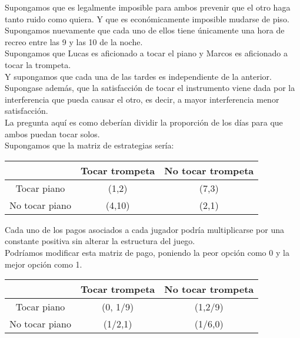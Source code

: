 \documentclass[10pt,a4paper]{book}
\begin{document}
Supongamos que es legalmente imposible para ambos prevenir que el otro haga tanto ruido como quiera. Y que es económicamente imposible mudarse de piso.\\

Supongamos nuevamente que cada uno de ellos tiene únicamente una hora de recreo entre las 9 y las 10 de la noche.\\

Supongamos que Lucas es aficionado a tocar el piano y Marcos es aficionado a tocar la trompeta.\\

Y supongamos que cada una de las tardes es independiente de la anterior.\\

Supongase además, que la satisfacción de tocar el instrumento viene dada por la interferencia que pueda causar el otro, es decir, a mayor interferencia menor satisfacción.\\

La pregunta aquí es como deberían dividir la proporción de los días para que ambos puedan tocar solos.\\

Supongamos que la matriz de estrategias sería:\\

\begin{center}
	\begin{tabular}{|c|c|c|}
		\hline
		 & Tocar trompeta & No tocar trompeta\\
		\hline
		Tocar piano & (1,2) & (7,3) \\
		\hline
		No tocar piano & (4,10) & (2,1) \\
		\hline
	\end{tabular}
\end{center}

Cada uno de los pagos asociados a cada jugador podría multiplicarse por una constante positiva sin alterar la estructura del juego.\\

Podríamos modificar esta matriz de pago, poniendo la peor opción como 0 y la mejor opción como 1. \\


\begin{center}
	\begin{tabular}{|c|c|c|}
		\hline
		 & Tocar trompeta & No tocar trompeta\\
		\hline
		Tocar piano & (0, 1/9) & (1,2/9) \\
		\hline
		No tocar piano & (1/2,1) & (1/6,0) \\
		\hline
	\end{tabular}
\end{center}
\end{document}
